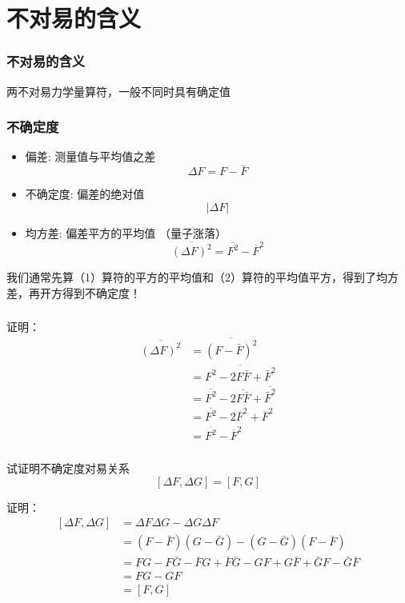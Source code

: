 \section{不对易的含义}
\begin{frame} 
    \frametitle{不对易的含义}
    \begin{tcolorbox}[colback=yellow!5,colframe=yellow!75!black,title=不确定性原理]
        两不对易力学量算符，一般不同时具有确定值                 
    \end{tcolorbox}
\end{frame} 

\begin{frame} 
    \frametitle{不确定度}
    \begin{itemize}
        \item 偏差: 测量值与平均值之差
        $$ \Delta F=F-\bar{F} $$
        \item 不确定度: 偏差的绝对值
         $$ \left | \Delta F  \right | $$
        \item 均方差: 偏差平方的平均值 （量子涨落）
        $$ \overline{(\Delta F)^2} = \overline{F^2} - \overline{F}^2$$
    \end{itemize}   
    我们通常先算（1）算符的平方的平均值和（2）算符的平均值平方，得到了均方差，再开方得到不确定度！
\end{frame} 


\begin{frame} 
    \frametitle{}
    \alert{证明：}
    \begin{equation*}
        \begin{split} 
        \overline{(\Delta F)^2}&= \overline{(F-\bar{F})^2}\\
        &=\overline{F^2-2F\bar{F}+\bar{F}^2 }\\
        &=\overline{F^2} -2\overline{F\bar{F}} +\overline{\bar{F}^2 }\\
        &=\overline{F^2} -2\overline{F}^2 +\overline{F}^2\\
        &= \overline{F^2} - \overline{F}^2
        \end{split}  
    \end{equation*} 
\end{frame} 

\begin{frame} 
    \frametitle{}
    \begin{tcolorbox}[colback=yellow!5,colframe=yellow!75!black,title]
     试证明不确定度对易关系  $$[\Delta F, \Delta G]= [F, G]$$
    \end{tcolorbox}
    \alert{证明：}
    \begin{equation*}
        \begin{split} 
        [\Delta F, \Delta G]&= \Delta F \Delta G - \Delta G \Delta F \\
        &=(F-\bar{F}) (G-\bar{G})- (G-\bar{G}) (F-\bar{F}) \\
        &=FG -F\bar{G}-\bar{F}G + \bar{F} \bar{G} -GF + G \bar{F} + \bar{G} F -\bar{G} \bar{F}   \\
        &=FG-GF \\
        &=[F, G]
        \end{split}  
    \end{equation*} 
\end{frame} 

